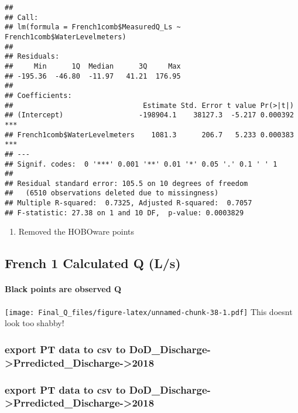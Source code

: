 \documentclass[
]{article}
\providecommand{\tightlist}{%
  \setlength{\itemsep}{0pt}\setlength{\parskip}{0pt}}
\begin{document}
\begin{verbatim}
## 
## Call:
## lm(formula = French1comb$MeasuredQ_Ls ~ French1comb$WaterLevelmeters)
## 
## Residuals:
##     Min      1Q  Median      3Q     Max 
## -195.36  -46.80  -11.97   41.21  176.95 
## 
## Coefficients:
##                               Estimate Std. Error t value Pr(>|t|)    
## (Intercept)                  -198904.1    38127.3  -5.217 0.000392 ***
## French1comb$WaterLevelmeters    1081.3      206.7   5.233 0.000383 ***
## ---
## Signif. codes:  0 '***' 0.001 '**' 0.01 '*' 0.05 '.' 0.1 ' ' 1
## 
## Residual standard error: 105.5 on 10 degrees of freedom
##   (6510 observations deleted due to missingness)
## Multiple R-squared:  0.7325, Adjusted R-squared:  0.7057 
## F-statistic: 27.38 on 1 and 10 DF,  p-value: 0.0003829
\end{verbatim}

\begin{enumerate}
\def\labelenumi{\arabic{enumi})}
\tightlist
\item
  Removed the HOBOware points
\end{enumerate}

\hypertarget{french-1-calculated-q-ls-1}{%
\subsection{French 1 Calculated Q
(L/s)}\label{french-1-calculated-q-ls-1}}

\hypertarget{black-points-are-observed-q-3}{%
\paragraph{Black points are observed
Q}\label{black-points-are-observed-q-3}}

\texttt{[image: Final\_Q\_files/figure-latex/unnamed-chunk-38-1.pdf]} This
doesnt look too shabby!

\hypertarget{export-pt-data-to-csv-to-dod_discharge-prredicted_discharge-2018-1}{%
\subsubsection{export PT data to csv to
DoD\_Discharge-\textgreater Prredicted\_Discharge-\textgreater2018}\label{export-pt-data-to-csv-to-dod_discharge-prredicted_discharge-2018-1}}

\hypertarget{export-pt-data-to-csv-to-dod_discharge-prredicted_discharge-2018-2}{%
\subsubsection{export PT data to csv to
DoD\_Discharge-\textgreater Prredicted\_Discharge-\textgreater2018}\label{export-pt-data-to-csv-to-dod_discharge-prredicted_discharge-2018-2}}
\end{document}
